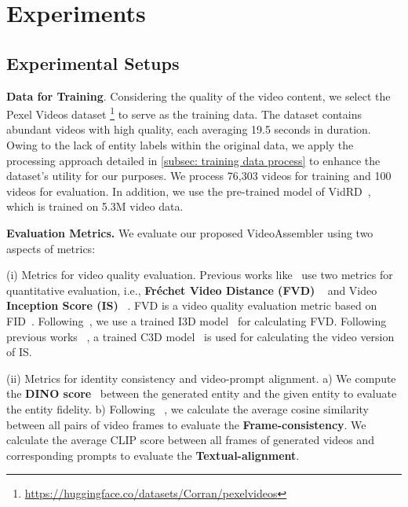 \section{Experiments}
\label{sec:experiments}


\subsection{Experimental Setups}


\textbf{Data for Training}. Considering the quality of the video content, we select the Pexel Videos dataset \footnote{\url{https://huggingface.co/datasets/Corran/pexelvideos}} to serve as the training data. The dataset contains abundant videos with high quality, each averaging 19.5 seconds in duration. Owing to the lack of entity labels within the original data, we apply the processing approach detailed in \cref{subsec: training data process} to enhance the dataset's utility for our purposes. We process 76,303 videos for training and 100 videos for evaluation. In addition, we use the pre-trained model of VidRD~\cite{gu2023reuse}, which is trained on 5.3M video data.


\noindent
\textbf{Evaluation Metrics.}
We evaluate our proposed VideoAssembler using two aspects of metrics:

(i) Metrics for video quality evaluation. Previous works like~\cite{singer2022make, ge2023preserve, blattmann2023align} use two metrics for quantitative evaluation, i.e., \textbf{Fr\'{e}chet Video Distance (FVD)} ~\cite{thomas2019fvd} and Video \textbf{Inception Score (IS) }~\cite{saito2020generate}. FVD is a video quality evaluation metric based on FID~\cite{parmar2022fid}. Following~\cite{singer2022make}, we use a trained I3D model~\cite{carreira2017i3d} for calculating FVD. Following previous works ~\cite{singer2022make, hong2023cogvideo, blattmann2023align}, a trained C3D model~\cite{tran2015leanring} is used for calculating the video version of IS.

(ii) Metrics for identity consistency and video-prompt alignment.
a) We compute the \textbf{DINO score}~\cite{ruiz2023dreambooth} between the generated entity and the given entity to evaluate the entity fidelity. b) Following ~\cite{wu2023tune_a_video}, we calculate the average cosine similarity between all pairs of video frames to evaluate the \textbf{Frame-consistency}. We calculate the average CLIP score between all frames of generated videos and corresponding prompts to evaluate the \textbf{Textual-alignment}.


